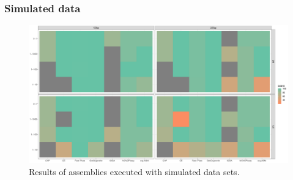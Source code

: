 \subsubsection{Simulated data}
\begin{figure}[H]
\centering
\includegraphics[height=.45\textheight, width=.95\textwidth]{Figures/sim_tiles}
\decoRule
\caption[Score of assemblies of simulated data sets]{Results of assemblies executed with simulated data sets.}
\label{fig:sim_tiles}
\end{figure}



